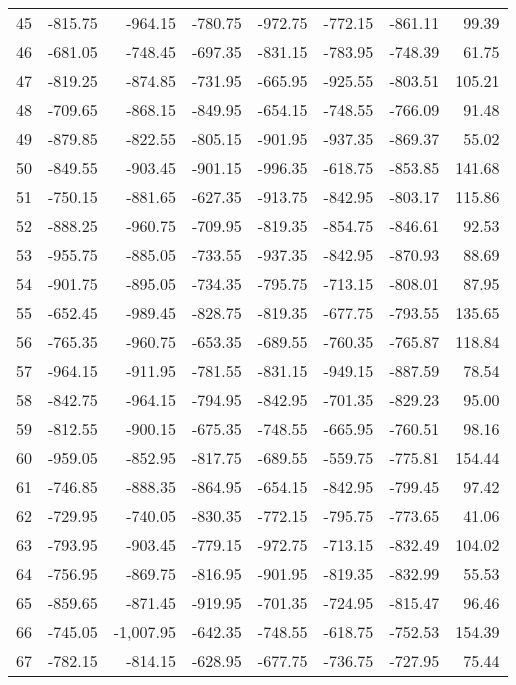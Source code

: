 \begin{longtable}{rrrrrrrr}
45 & -815.75 & -964.15 & -780.75 & -972.75 & -772.15 & -861.11 & 99.39  \\
46 & -681.05 & -748.45 & -697.35 & -831.15 & -783.95 & -748.39 & 61.75  \\
47 & -819.25 & -874.85 & -731.95 & -665.95 & -925.55 & -803.51 & 105.21  \\
48 & -709.65 & -868.15 & -849.95 & -654.15 & -748.55 & -766.09 & 91.48  \\
49 & -879.85 & -822.55 & -805.15 & -901.95 & -937.35 & -869.37 & 55.02  \\
50 & -849.55 & -903.45 & -901.15 & -996.35 & -618.75 & -853.85 & 141.68  \\
51 & -750.15 & -881.65 & -627.35 & -913.75 & -842.95 & -803.17 & 115.86  \\
52 & -888.25 & -960.75 & -709.95 & -819.35 & -854.75 & -846.61 & 92.53  \\
53 & -955.75 & -885.05 & -733.55 & -937.35 & -842.95 & -870.93 & 88.69  \\
54 & -901.75 & -895.05 & -734.35 & -795.75 & -713.15 & -808.01 & 87.95  \\
55 & -652.45 & -989.45 & -828.75 & -819.35 & -677.75 & -793.55 & 135.65  \\
56 & -765.35 & -960.75 & -653.35 & -689.55 & -760.35 & -765.87 & 118.84  \\
57 & -964.15 & -911.95 & -781.55 & -831.15 & -949.15 & -887.59 & 78.54  \\
58 & -842.75 & -964.15 & -794.95 & -842.95 & -701.35 & -829.23 & 95.00  \\
59 & -812.55 & -900.15 & -675.35 & -748.55 & -665.95 & -760.51 & 98.16  \\
60 & -959.05 & -852.95 & -817.75 & -689.55 & -559.75 & -775.81 & 154.44  \\
61 & -746.85 & -888.35 & -864.95 & -654.15 & -842.95 & -799.45 & 97.42  \\
62 & -729.95 & -740.05 & -830.35 & -772.15 & -795.75 & -773.65 & 41.06  \\
63 & -793.95 & -903.45 & -779.15 & -972.75 & -713.15 & -832.49 & 104.02  \\
64 & -756.95 & -869.75 & -816.95 & -901.95 & -819.35 & -832.99 & 55.53  \\
65 & -859.65 & -871.45 & -919.95 & -701.35 & -724.95 & -815.47 & 96.46  \\
66 & -745.05 & -1,007.95 & -642.35 & -748.55 & -618.75 & -752.53 & 154.39  \\
67 & -782.15 & -814.15 & -628.95 & -677.75 & -736.75 & -727.95 & 75.44  \\

\end{longtable}
